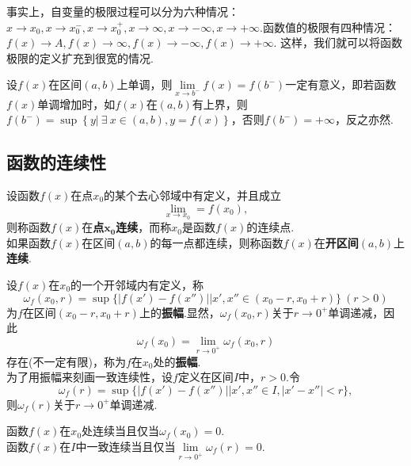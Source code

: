 	事实上，自变量的极限过程可以分为六种情况：$x\rightarrow x_0,x\rightarrow x_0^{-},x\rightarrow x_0^{+},x\rightarrow\infty,x\rightarrow-\infty,x\rightarrow+\infty$.函数值的极限有四种情况：$f(x)\rightarrow A,f(x)\rightarrow\infty,f(x)\rightarrow-\infty,f(x)\rightarrow+\infty$.
	这样，我们就可以将函数极限的定义扩充到很宽的情况.
	\begin{proposition}[单调函数单侧极限存在定理]
		设$f(x)$在区间$(a,b)$上单调，则$\lim\limits_{x\rightarrow b^{-}}f(x)=f(b^{-})$一定有意义，即若函数$f(x)$单调增加时，如$f(x)$在$(a,b)$有上界，则$f(b^{-})=\sup\left\{y\vert\ \exists\ x\in(a,b),y=f(x)\right\}$，否则$f(b^{-})=+\infty$，反之亦然.
	\end{proposition}
	\subsection{函数的连续性}
	\begin{definition}[连续函数]
		设函数$f(x)$在点$x_0$的某个去心邻域中有定义，并且成立$$\lim\limits_{x\rightarrow x_0}=f(x_0),$$
		则称函数$f(x)$在\textbf{点}$\bm{x_0}$\textbf{连续}，而称$x_0$是函数$f(x)$的连续点.\\
		如果函数$f(x)$在区间$(a,b)$的每一点都连续，则称函数$f(x)$在\textbf{开区间}$(a,b)$上\textbf{连续}.
	\end{definition}
	\begin{definition}[振幅]
		设$f(x)$在$x_0$的一个开邻域内有定义，称$$\omega_{f}(x_0,r)=\sup\{|f(x')-f(x'')|\vert x',x''\in(x_0-r,x_0+r)\}\ (r>0)$$
		为$f$在区间$(x_0-r,x_0+r)$上的\textbf{振幅}.显然，$\omega_f(x_0,r)$关于$r\rightarrow0^{+}$单调递减，因此$$\omega_f(x_0)=\lim\limits_{r\rightarrow0^{+}}\omega_f(x_0,r)$$
		存在(不一定有限)，称为$f$在$x_0$处的\textbf{振幅}.\\
		为了用振幅来刻画一致连续性，设$f$定义在区间$I$中，$r>0$.令$$\omega_f(r)=\sup\{|f(x')-f(x'')|\vert x',x''\in I,|x'-x''|<r\},$$
		则$\omega_f(r)$关于$r\rightarrow0^{+}$单调递减.
	\end{definition}
	\begin{theorem}
		函数$f(x)$在$x_0$处连续当且仅当$\omega_f(x_0)=0$.\\
		函数$f(x)$在$I$中一致连续当且仅当$\lim\limits_{r\rightarrow0^{+}}\omega_f(r)=0$.
	\end{theorem}

